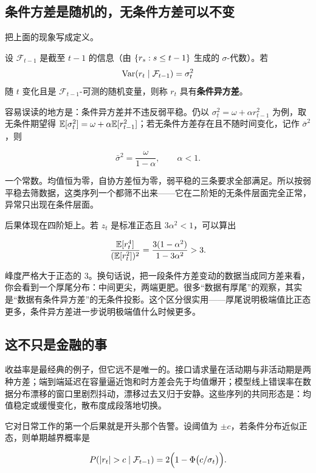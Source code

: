 \subsection{条件方差是随机的，无条件方差可以不变}

把上面的现象写成定义。

\begin{definition}
设 \(\mathcal F_{t-1}\) 是截至 \(t-1\) 的信息（由 \(\left\{r_s:s\le t-1\right\}\) 生成的 \(\sigma\)-代数）。若
\[
\operatorname{Var}(r_t\mid\mathcal F_{t-1})=\sigma_t^2
\]
随 \(t\) 变化且是 \(\mathcal F_{t-1}\)-可测的随机变量，则称 \(r_t\) 具有\textbf{条件异方差}。
\end{definition}

容易误读的地方是：条件异方差并不违反弱平稳。仍以 \(\sigma_t^2=\omega+\alpha r_{t-1}^2\) 为例，取无条件期望得 \(\mathbb{E}[\sigma_t^2]=\omega+\alpha\mathbb{E}[r_{t-1}^2]\)；若无条件方差存在且不随时间变化，记作 \(\bar\sigma^2\)，则

\[
\bar\sigma^2=\frac{\omega}{1-\alpha},
\qquad \alpha<1 .
\]

一个常数。均值恒为零，自协方差恒为零，弱平稳的三条要求全部满足。所以按弱平稳去筛数据，这类序列一个都筛不出来——它在二阶矩的无条件层面完全正常，异常只出现在条件层面。

后果体现在四阶矩上。若 \(z_t\) 是标准正态且 \(3\alpha^2<1\)，可以算出

\[
\frac{\mathbb{E}[r_t^4]}{(\mathbb{E}[r_t^2])^2}=\frac{3(1-\alpha^2)}{1-3\alpha^2}>3 .
\]

峰度严格大于正态的 \(3\)。换句话说，把一段条件方差变动的数据当成同方差来看，你会看到一个厚尾分布：中间更尖，两端更肥。很多``数据有厚尾''的观察，其实是``数据有条件异方差''的无条件投影。这个区分很实用——厚尾说明极端值比正态更多，条件异方差进一步说明极端值什么时候更多。

\subsection{这不只是金融的事}

收益率是最经典的例子，但它远不是唯一的。接口请求量在活动期与非活动期是两种方差；端到端延迟在容量逼近饱和时方差会先于均值爆开；模型线上错误率在数据分布漂移的窗口里剧烈抖动，漂移过去又归于安静。这些序列的共同形态是：均值稳定或缓慢变化，散布度成段落地切换。

它对日常工作的第一个后果就是开头那个告警。设阈值为 \(\pm c\)，若条件分布近似正态，则单期越界概率是

\[
P(\abs{r_t}>c\given\mathcal F_{t-1})=2\Big(1-\Phi\big(c/\sigma_t\big)\Big).
\]

